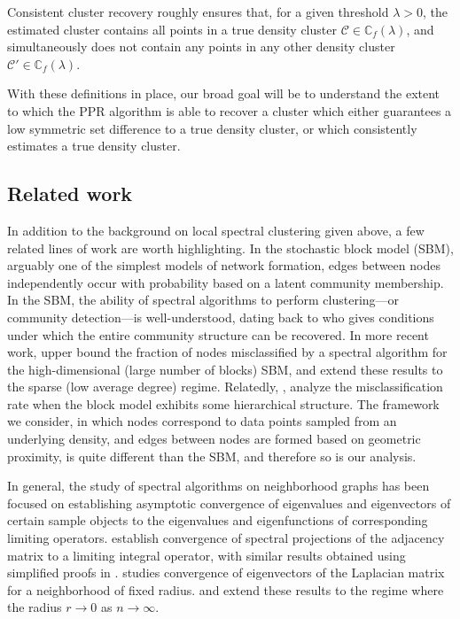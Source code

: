 \documentclass[11pt,twoside]{article}
\newcommand{\1}{\mathbbm{1}}
\newcommand{\Cbb}{\mathbb{C}}
\newcommand{\Cset}{\mathcal{C}}
\newcommand{\Cest}{\widehat{C}}
\begin{document}
Consistent cluster recovery roughly ensures that, for a given 
threshold $\lambda>0$, the estimated cluster \smash{$\Cest$} contains all points
in a true density cluster $\Cset \in \Cbb_f(\lambda)$, and simultaneously does 
not contain any points in any other density cluster $\Cset' \in
\Cbb_f(\lambda)$. 

With these definitions in place, our broad goal will be to understand the extent
to which the PPR algorithm is able to recover a cluster which either guarantees
a low symmetric set difference to a true density cluster, or which consistently
estimates a true density cluster.

\subsection{Related work}

In addition to the background on local spectral clustering given above, a
few related lines of work are worth highlighting. In the stochastic block model
(SBM), arguably one of the simplest models of network formation, edges between
nodes independently occur with probability based on a latent community
membership. In the SBM, the ability of spectral algorithms to perform
clustering---or community detection---is well-understood, dating 
back to \citet{mcsherry2001} who gives conditions under which the entire
community structure can be recovered. In more recent work, \citet{rohe2011}
upper bound the fraction of nodes misclassified by a spectral algorithm for the
high-dimensional (large number of blocks) SBM, and \citet{lei2015} extend these
results to the sparse (low average degree) regime. Relatedly,
\citet{clauset08,balakrishnan2011,li2018}, analyze the misclassification rate
when the block model exhibits some hierarchical structure. The framework we
consider, in which nodes correspond to data points sampled from an underlying 
density, and edges between nodes are formed based on geometric proximity, is
quite different than the SBM, and therefore so is our analysis.

In general, the study of spectral algorithms on neighborhood graphs has been
focused on establishing asymptotic convergence of eigenvalues and eigenvectors
of certain sample objects to the eigenvalues and eigenfunctions of corresponding
limiting operators. \citet{koltchinskii2000} establish convergence of spectral
projections of the adjacency matrix to a limiting integral operator, with
similar results obtained using simplified proofs in
\citet{rosasco10}. \citet{vonluxburg2008} studies convergence of eigenvectors of
the Laplacian matrix for a neighborhood of fixed radius. \citet{belkin07} and
\citet{garciatrillos18} extend these results to the regime where the radius $r
\to 0$ as $n \to \infty$.
\end{document}
